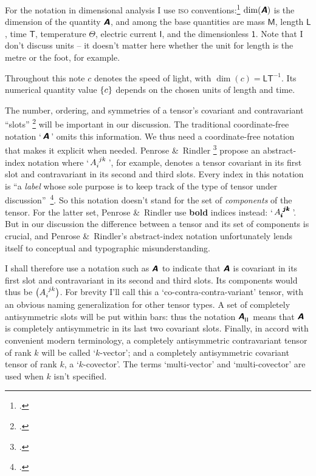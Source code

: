 \documentclass[\ifafour a4paper,12pt,\else a5paper,10pt,\fi%
onecolumn,oneside,article,%
british%
]{memoir}
\makeatletter
\newcommand*{\defquote}[1]{`#1'}
\newcommand*{\mathquote}[1]{`\,#1\,'}
\theoremstyle{remark}
\theoremstyle{innote}
\newcommand*{\mathte}[1]{\textbf{\textit{\textsf{#1}}}}
\newcommand*{\citep}{\footcites}
\newcommand*{\amp}{\&}
\DeclarePairedDelimiter\set{\{}{\}}
\renewcommand*{\|}[1][]{\nonscript\,#1\vert\nonscript\;\mathopen{}}
\newcommand*{\sect}{\S}%
\newcommand*{\q}{}%
\DeclareRobustCommand*{\q}{%
  \mathbin{\mathpalette\bigcdot@{}}%
}
\newcommand*{\bigcdot@scalefactor}{0.7}
\newcommand*{\bigcdot@widthfactor}{1.5}
\newcommand*{\bigcdot@}[2]{%
  \sbox0{$#1\vcenter{}$}%
  \sbox2{$#1\cdot\m@th$}%
  \hbox to \bigcdot@widthfactor\wd2{%
    \hfil
    \raise\ht0\hbox{%
      \scalebox{\bigcdot@scalefactor}{%
        \lower\ht0\hbox{$#1\bullet\m@th$}%
      }%
    }%
    \hfil
  }%
}
\newcommand*{\Un}{\textsf{1}}
\newcommand*{\Le}{\textsf{L}}
\newcommand*{\Ti}{\textsf{T}}
\newcommand*{\Ma}{\textsf{M}}
\newcommand*{\Te}{\Theta}
\newcommand*{\Cu}{\textsf{I}}
\newcommand*{\yA}{\mathte{A}}
\renewcommand*{\i}{\indices}
\newcommand*{\rul}{{\mkern2mu\rule[-0.1ex]{0.75pt}{1.1ex}\mkern2mu}}
\DeclarePairedDelimiter\mul{\rul}{\rul}%
\makeatother
\begin{document}
\bigskip

For the notation in dimensional analysis I use \textsc{iso}
conventions:\citep[\sect~5]{iso2009} $\dim(\yA)$ is the dimension of the
quantity $\yA$, and among the base quantities are mass $\Ma$, length $\Le$,
time $\Ti$, temperature $\Te$, electric current $\Cu$, and the
dimensionless $\Un$. Note that I don't discuss units -- it doesn't matter
here whether the unit for length is the metre or the foot, for example.

Throughout this note $c$ denotes the speed of light, with
$\dim(c) = \Le\Ti^{-1}$. Its numerical quantity value $\set{c}$ depends on
the chosen units of length and time.

The number, ordering, and symmetries of a tensor's covariant and
contravariant \enquote{slots} \citep[\sect~3.2]{misneretal1970_r1973} will
be important in our discussion. The traditional coordinate-free notation
\mathquote{$\yA$} omits this information. We thus need a coordinate-free
notation that makes it explicit when needed. Penrose \amp\ Rindler
\citep[\sect~2.2]{penroseetal1984_r2003} propose an abstract-index notation
where \mathquote{$A\i{_{i}^{jk}}$}, for example, denotes a tensor covariant
in its first slot and contravariant in its second and third slots. Every
index in this notation is \enquote{a \emph{label} whose sole purpose is to
  keep track of the type of tensor under
  discussion}~\citep[p.~75]{penroseetal1984_r2003}. So this notation
doesn't stand for the set of \emph{components} of the tensor. For the
latter set, Penrose \amp\ Rindler use \textbf{bold} indices instead:
\mathquote{$A\i{_{\pmb{i}}^{\pmb{j}\pmb{k}}}$}. But in our discussion the
difference between a tensor and its set of components is crucial, and
Penrose \amp\ Rindler's abstract-index notation unfortunately lends itself
to conceptual and typographic misunderstanding.

I shall therefore use a notation such as $\yA\i{_{\q}^{\q\q}}$ to indicate
that $\yA$ is covariant in its first slot and contravariant in its second
and third slots. Its components would thus be $\bigl(A\i{_{i}^{jk}}\bigr)$.
For brevity I'll call this a \defquote{co-contra-contra-variant} tensor,
with an obvious naming generalization for other tensor
types. %
A set of completely antisymmetric slots will be put within bars: thus the
notation $\yA\i{^{\q}_{\mul{\q\q}}}$ means that $\yA$ is completely
antisymmetric in its last two covariant slots. Finally, in accord with
convenient modern terminology, a completely antisymmetric contravariant
tensor of rank $k$ will be called \defquote{$k$-vector}; and a completely
antisymmetric covariant tensor of rank $k$, a \defquote{$k$-covector}. The
terms \defquote{multi-vector} and \defquote{multi-covector} are used when
$k$ isn't specified.
\end{document}
